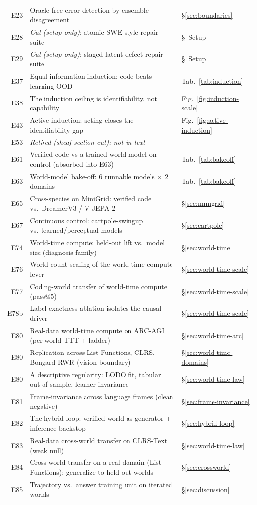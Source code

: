 \documentclass[11pt]{article}
\begin{document}
\begin{longtable}{@{}r p{} l@{}}
E23 & Oracle-free error detection by ensemble disagreement & \S\ref{sec:boundaries} \\
E28 & \emph{Cut (setup only)}: atomic SWE-style repair suite & \S~Setup \\
E29 & \emph{Cut (setup only)}: staged latent-defect repair suite & \S~Setup \\
E37 & Equal-information induction: code beats learning OOD & Tab.~\ref{tab:induction} \\
E38 & The induction ceiling is identifiability, not capability & Fig.~\ref{fig:induction-scale} \\
E43 & Active induction: acting closes the identifiability gap & Fig.~\ref{fig:active-induction} \\
E53 & \emph{Retired (sheaf section cut); not in text} & --- \\
E61 & Verified code vs a trained world model on control (absorbed into E63) & Tab.~\ref{tab:bakeoff} \\
E63 & World-model bake-off: 6 runnable models $\times$ 2 domains & Tab.~\ref{tab:bakeoff} \\
E65 & Cross-species on MiniGrid: verified code vs.\ DreamerV3 / V-JEPA-2 & \S\ref{sec:minigrid} \\
E67 & Continuous control: cartpole-swingup vs.\ learned/perceptual models & \S\ref{sec:cartpole} \\
E74 & World-time compute: held-out lift vs.\ model size (diagnosis family) & \S\ref{sec:world-time} \\
E76 & World-count scaling of the world-time-compute lever & \S\ref{sec:world-time-scale} \\
E77 & Coding-world transfer of world-time compute (pass@5) & \S\ref{sec:world-time-scale} \\
E78b & Label-exactness ablation isolates the causal driver & \S\ref{sec:world-time-scale} \\
E80 & Real-data world-time compute on ARC-AGI (per-world TTT + ladder) & \S\ref{sec:world-time-arc} \\
E80 & Replication across List Functions, CLRS, Bongard-RWR (vision boundary) & \S\ref{sec:world-time-domains} \\
E80 & A descriptive regularity: LODO fit, tabular out-of-sample, learner-invariance & \S\ref{sec:world-time-law} \\
E81 & Frame-invariance across language frames (clean negative) & \S\ref{sec:frame-invariance} \\
E82 & The hybrid loop: verified world as generator + inference backstop & \S\ref{sec:hybrid-loop} \\
E83 & Real-data cross-world transfer on CLRS-Text (weak null) & \S\ref{sec:world-time-law} \\
E84 & Cross-world transfer on a real domain (List Functions); generalize to held-out worlds & \S\ref{sec:crossworld} \\
E85 & Trajectory vs.\ answer training unit on iterated worlds & \S\ref{sec:discussion} \\
\end{longtable}
\endgroup
\end{document}
